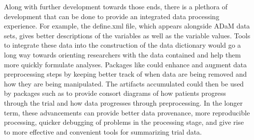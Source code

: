 Along with further development towards those ends, there is a plethora
of development that can be done to provide an integrated data processing
experience. For example, the define.xml file, which appears alongside
ADaM data sets, gives better descriptions of the variables as well as
the variable values. Tools to integrate these data into the construction
of the data dictionary would go a long way towards orienting researchers
with the data contained and help them more quickly formulate analyses.
Packages like  \citep{lumberjack} could enhance and
augment data preprocessing steps by keeping better track of when data
are being removed and how they are being manipulated. The artifacts
accumulated could then be used by packages such as 
\citep{ggconsort} to provide consort diagrams of how patients progress
through the trial and how data progresses through preprocessing. In the
longer term, these advancements can provide better data provenance, more
reproducible processing, quicker debugging of problems in the processing
stage, and give rise to more effective and convenient tools for
summarizing trial data.



\address{%
Michael J. Kane\\
Yale University\\%
60 College Street\\ New Haven, CT 06510, USA\\
%
%
%
\href{mailto:michael.kane@yale.edu}{\nolinkurl{michael.kane@yale.edu}}%
}
